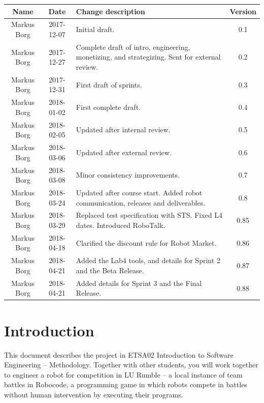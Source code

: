 \documentclass{scrreprt}
\begin{document}
\begin{center}
    \begin{tabular}{|c|c|p{8cm}|c|}
        \hline
	    Name & Date & Change description & Version\\
        \hline
	    Markus Borg & 2017-12-07 & Initial draft. & 0.1\\
        \hline
        Markus Borg & 2017-12-27 & Complete draft of intro, engineering, monetizing, and strategizing. Sent for external review. & 0.2\\
        \hline
        Markus Borg & 2017-12-31 & First draft of sprints. & 0.3\\
        \hline
        Markus Borg & 2018-01-02 & First complete draft. & 0.4\\
        \hline
        Markus Borg & 2018-02-05 & Updated after internal review. & 0.5\\
        \hline
        Markus Borg & 2018-03-06 & Updated after external review. & 0.6\\
        \hline
        Markus Borg & 2018-03-08 & Minor consistency improvements. & 0.7\\
        \hline
        Markus Borg & 2018-03-24 & Updated after course start. Added robot communication, releases and deliverables. & 0.8\\
        \hline
        Markus Borg & 2018-03-29 & Replaced test specification with STS. Fixed L4 dates. Introduced RoboTalk. & 0.85\\
        \hline
        Markus Borg & 2018-04-18 & Clarified the discount rule for Robot Market. & 0.86\\
        \hline
        Markus Borg & 2018-04-21 & Added the Lab4 tools, and details for Sprint 2 and the Beta Release. & 0.87\\
        \hline
        Markus Borg & 2018-04-21 & Added details for Sprint 3 and the Final Release. & 0.88\\
        \hline
    \end{tabular}
\end{center}

\chapter{Introduction}
This document describes the project in ETSA02 Introduction to Software Engineering -- Methodology. Together with other students, you will work together to engineer a robot for competition in LU Rumble -- a local instance of team battles in Robocode, a programming game in which robots compete in battles without human intervention by executing their programs.
\end{document}
